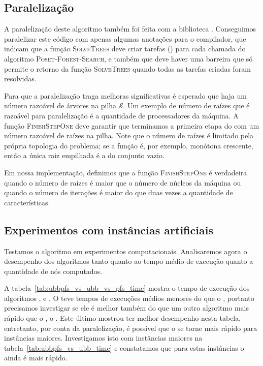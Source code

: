 \subsection{Paralelização}
A paralelização deste algoritmo também foi feita com a biblioteca 
. Conseguimos paralelizar este código com apenas 
algumas anotações para o compilador, que indicam que a função
\textsc{SolveTrees} deve criar tarefas () para cada 
chamada do algoritmo \textsc{Poset-Forest-Search}, e também que deve 
haver uma barreira que só permite o retorno da função 
\textsc{SolveTrees} quando todas as tarefas criadas foram resolvidas.

Para que a paralelização traga melhoras significativas é esperado que
haja um número razoável de árvores na pilha $\mathcal{S}$. Um exemplo de
número de raízes que é razoável para paralelização é a quantidade de
processadores da máquina. A função \textsc{FinishStepOne} deve garantir
que terminamos a primeira etapa do  com um número
razoável de raízes na pilha. Note que o número de raízes é limitado
pela própria topologia do problema; se a função é, por exemplo, monótona
crescente, então a única raiz empilhada é a do conjunto vazio.

Em nossa implementação, definimos que a função \textsc{FinishStepOne} é
verdadeira quando o número de raízes é maior que o número de núcleos da 
máquina ou quando o número de iterações é maior do que duas vezes a 
quantidade de características. 

\subsection{Experimentos com instâncias artificiais}
Testamos o algoritmo  em experimentos computacionais. Analisaremos agora o desempenho dos algoritmos tanto quanto ao 
tempo médio de execução quanto a quantidade de nós computados.

A tabela~\ref{tab:ubbpfs_vs_ubb_vs_pfs_time} mostra o tempo de execução
dos algoritmos ,  e . O 
 teve tempos de execuções médios menores do que o 
, portanto precisamos investigar se ele é melhor também do
que um outro algoritmo mais rápido que o , o .
Este último mostrou ter melhor desempenho nesta tabela, entretanto, 
por conta da paralelização, é possível que o  se torne 
mais rápido para instâncias maiores. Investigamos isto com instâncias
maiores na tabela~\ref{tab:ubbpfs_vs_ubb_time} e constatamos que 
para estas instâncias o  ainda é mais rápido.

